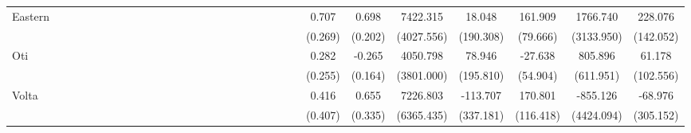 {\begin{tabular}{l*{29}{c}}
Eastern             &              &              &              &              &              &              &              &              &              &              &              &              &              &              &              &              &              &              &              &              &              &              &0.707\sym{**} &0.698\sym{***}&7422.315         &18.048         &161.909\sym{*}  &1766.740         &228.076         \\
                    &              &              &              &              &              &              &              &              &              &              &              &              &              &              &              &              &              &              &              &              &              &              &(0.269)         &(0.202)         &(4027.556)         &(190.308)         &(79.666)         &(3133.950)         &(142.052)         \\
Oti                 &              &              &              &              &              &              &              &              &              &              &              &              &              &              &              &              &              &              &              &              &              &              &0.282         &-0.265         &4050.798         &78.946         &-27.638         &805.896         &61.178         \\
                    &              &              &              &              &              &              &              &              &              &              &              &              &              &              &              &              &              &              &              &              &              &              &(0.255)         &(0.164)         &(3801.000)         &(195.810)         &(54.904)         &(611.951)         &(102.556)         \\
Volta               &              &              &              &              &              &              &              &              &              &              &              &              &              &              &              &              &              &              &              &              &              &              &0.416         &0.655         &7226.803         &-113.707         &170.801         &-855.126         &-68.976         \\
                    &              &              &              &              &              &              &              &              &              &              &              &              &              &              &              &              &              &              &              &              &              &              &(0.407)         &(0.335)         &(6365.435)         &(337.181)         &(116.418)         &(4424.094)         &(305.152)         \\

\end{tabular}}
